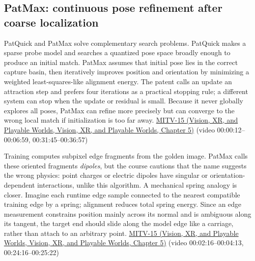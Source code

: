 \subsection{PatMax: continuous pose refinement after coarse localization}\label{04-visual-computing-ii-ch030-patmax-continuous-pose-refinement-after-coarse-localization}

PatQuick and PatMax solve complementary search problems. PatQuick makes a sparse probe model and searches a quantized pose space broadly enough to produce an initial match. PatMax assumes that initial pose lies in the correct capture basin, then iteratively improves position and orientation by minimizing a weighted least-squares-like alignment energy. The patent calls an update an attraction step and prefers four iterations as a practical stopping rule; a different system can stop when the update or residual is small. Because it never globally explores all poses, PatMax can refine more precisely but can converge to the wrong local match if initialization is too far away. \href{../07-Vision-XR-and-Playable-Worlds/main.pdf\#nameddest=04-visual-computing-ii-ch036-mitv-15---alignment-patmax-distance-field-filtering-and-sub-sampling-us-7065262}{MITV-15 (Vision, XR, and Playable Worlds, Vision, XR, and Playable Worlds, Chapter 5)} (video 00:00:12--00:06:59, 00:31:45--00:36:57)

Training computes subpixel edge fragments from the golden image. PatMax calls these oriented fragments \emph{dipoles}, but the course cautions that the name suggests the wrong physics: point charges or electric dipoles have singular or orientation-dependent interactions, unlike this algorithm. A mechanical spring analogy is closer. Imagine each runtime edge sample connected to the nearest compatible training edge by a spring; alignment reduces total spring energy. Since an edge measurement constrains position mainly across its normal and is ambiguous along its tangent, the target end should slide along the model edge like a carriage, rather than attach to an arbitrary point. \href{../07-Vision-XR-and-Playable-Worlds/main.pdf\#nameddest=04-visual-computing-ii-ch036-mitv-15---alignment-patmax-distance-field-filtering-and-sub-sampling-us-7065262}{MITV-15 (Vision, XR, and Playable Worlds, Vision, XR, and Playable Worlds, Chapter 5)} (video 00:02:16--00:04:13, 00:24:16--00:25:22)


